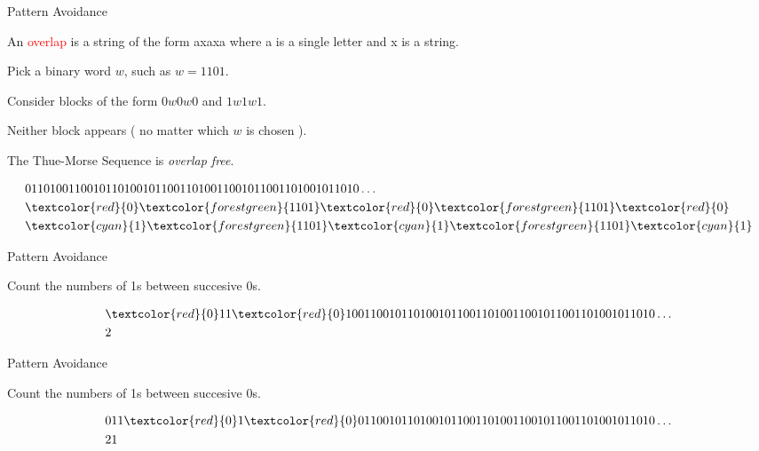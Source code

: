 \documentclass{beamer}
\begin{document}
\begin{frame}{Pattern Avoidance}
    
    An \textcolor{red}{overlap} is a string of the form axaxa where a is a single letter and x is a string. 

    \vspace{0.3cm}

    Pick a binary word \( w \), such as \( w = 1101 \).
    
    \vspace{0.3cm}
    
    Consider blocks of the form \( 0w0w0 \) and \( 1w1w1 \).
    
    \vspace{0.3cm}
    
    Neither block appears ( no matter which \( w \) is chosen ).
    
    \vspace{0.3cm}
    
    The Thue-Morse Sequence is \textit{overlap free}.

    \vspace{0.7cm}

    \[
    \begin{aligned}
        &011010011001011010010110011010011001011001101001011010\dots \\ 
        &\textcolor{red}{0}\textcolor{forestgreen}{1101}\textcolor{red}{0}\textcolor{forestgreen}{1101}\textcolor{red}{0} \\ 
        &\textcolor{cyan}{1}\textcolor{forestgreen}{1101}\textcolor{cyan}{1}\textcolor{forestgreen}{1101}\textcolor{cyan}{1}
    \end{aligned}
\]
 
\end{frame}

\begin{frame}{Pattern Avoidance}

    Count the numbers of 1s between succesive 0s.
    
    \[
    \begin{aligned}
        &\textcolor{red}{0}11\textcolor{red}{0}10011001011010010110011010011001011001101001011010\dots \\ 
        &2
    \end{aligned}
    \]
 
\end{frame}

\begin{frame}{Pattern Avoidance}

    Count the numbers of 1s between succesive 0s.
    
    \[
    \begin{aligned}
        &011\textcolor{red}{0}1\textcolor{red}{0}011001011010010110011010011001011001101001011010\dots \\ 
        &21
    \end{aligned}
    \]
 
\end{frame}
\end{document}
